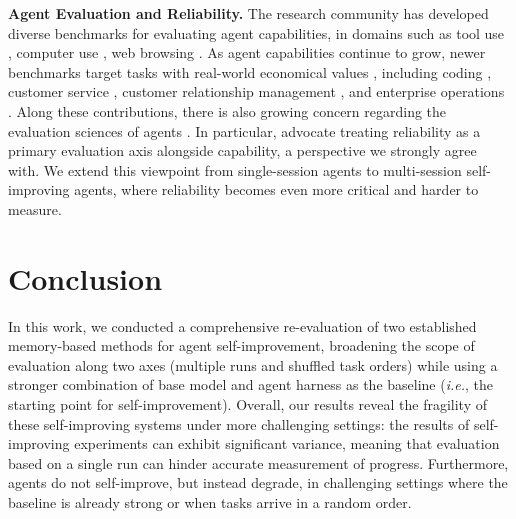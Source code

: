 \documentclass{article}
\begin{document}
\textbf{Agent Evaluation and Reliability.}
The research community has developed diverse benchmarks for evaluating agent capabilities, in domains such as tool use \cite{schick2023toolformerlanguagemodelsteach,wang2024executable}, computer use \cite{OSWorld}, web browsing \cite{zhou2024webarena,koh-etal-2024-visualwebarena,deng2023mind2web}. 
As agent capabilities continue to grow, newer benchmarks target tasks with real-world economical values \cite{patwardhan2025gdpvalevaluatingaimodel}, including coding \cite{jimenez2024swebench,deng2025swebenchproaiagents}, customer service \cite{yao2024taubenchbenchmarktoolagentuserinteraction,barres2025tau2benchevaluatingconversationalagents}, customer relationship management \cite{huang-etal-2025-crmarena,huang2026crmarenapro}, and enterprise operations \citep{malay2026enterpriseopsgymenvironmentsevaluationsstateful}.
Along these contributions, there is also growing concern regarding the evaluation sciences of agents \cite{rabanser2026scienceaiagentreliability,grace2026demystifying,zhu2025establishingbestpracticesbuilding,kapoor2025holisticagentleaderboardmissing}. 
In particular, \citet{rabanser2026scienceaiagentreliability} advocate treating reliability as a primary evaluation axis alongside capability, a perspective we strongly agree with. We extend this viewpoint from single-session agents to multi-session self-improving agents, where reliability becomes even more critical and harder to measure.

\vspace{-0.2cm}
\section{Conclusion}
\label{sec:conclusion}
In this work, we conducted a comprehensive re-evaluation of two established memory-based methods for agent self-improvement, broadening the scope of evaluation along two axes (multiple runs and shuffled task orders) while using a stronger combination of base model and agent harness as the baseline (\textit{i.e.}, the starting point for self-improvement). 
Overall, our results reveal the fragility of these self-improving systems under more challenging settings: the results of self-improving experiments can exhibit significant variance, meaning that evaluation based on a single run can hinder accurate measurement of progress. 
Furthermore, agents do not self-improve, but instead degrade, in challenging settings where the baseline is already strong or when tasks arrive in a random order.
\end{document}
